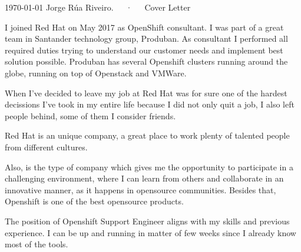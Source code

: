 \documentclass[11pt, a4paper]{awesome-cv}
\begin{document}
\makecvheader

\makecvfooter
  {\today}
  {Jorge Rúa Riveiro.~~~·~~~Cover Letter}
  {}


\begin{cvletter}


I joined Red Hat on May 2017 as OpenShift consultant. I was part of a great team in Santander technology group, Produban. As consultant I performed all required
duties trying to understand our customer needs and implement best solution possible. Produban has several Openshift clusters running around the globe, running on top
of Openstack and VMWare.

When I've decided to leave my job at Red Hat was for sure one of the hardest decissions I've took in my entire life because I did not only quit a job, I also left people
behind, some of them I consider friends. 
   

Red Hat is an unique company, a great place to work plenty of talented people from different cultures.

Also, is the type of company which gives me the opportunity to participate in a challenging environment, where I can learn from others and collaborate in an innovative manner,
as it happens in opensource communities. Besides that, Openshift is one of the best opensource products. 


The position of Openshift Support Engineer aligns with my skills and previous experience. I can be up and running in matter of few weeks since I already know most of the tools.
    
\end{cvletter}

\makeletterclosing
\end{document}
